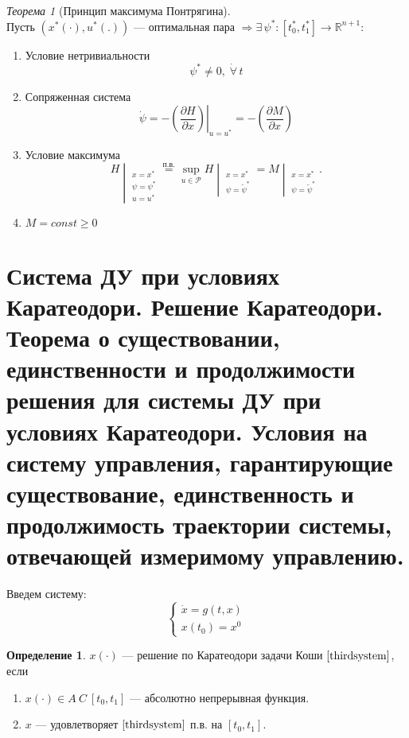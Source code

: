 \documentclass[oneside, final, 14pt, draft]{article}
\theoremstyle{definition}
\theoremstyle{definition}
\newtheorem{defin}{Определение}[section]
\theoremstyle{remark}
\theoremstyle{theorem}
\newtheorem{thm}{Теорема}[section]
\renewcommand{\geq}{\geqslant}
\begin{document}
\begin{thm}[Принцип максимума Понтрягина] \ \\
    Пусть $\left( x^*(\cdot), u^*(.)\right)$ --- оптимальная пара $\Rightarrow \exists\, \psi^*: \left[t_0^*, t_1^*\right] \rightarrow \mathbb{R}^{n+1}$:
    \begin{enumerate}
    \item Условие нетривиальности
    $$\psi^* \neq 0,\;\dot\forall\,t$$
    \item Сопряженная система
    \begin{equation*}
    \dot{\psi} = -\left.\left(\frac{\partial H}{\partial x}\right)\right|_{u=u^*} = -\left(\frac{\partial M}{\partial x}\right)
    \end{equation*}
    \item Условие максимума
    \begin{equation*}
    \left. H \middle|_{\substack{x = x^* \\ \psi = \psi^* \\ u = u^*}}\right. \stackrel{\text{п.в.}}{=}
    \sup\limits_{u \in \mathcal{P}} \left.H\middle|_{\substack{x = x^* \\ \psi = \widetilde{\psi}^*}}\right. =
    \left. M \middle|_{\substack{x = x^* \\ \psi = \widetilde{\psi}^*}}\right. .
    \end{equation*}
    \item $M = const \geq 0$
    \end{enumerate}
\end{thm}

\section{Система ДУ при условиях Каратеодори. Решение Каратеодори. Теорема о существовании, единственности и продолжимости решения для системы ДУ при условиях Каратеодори. Условия на систему управления, гарантирующие существование, единственность и продолжимость траектории системы, отвечающей измеримому управлению.}
Введем систему:
\begin{equation}\label{thirdsystem}
\begin{cases}
\dot{x} = g(t, x)\\
x(t_0) = x^0
\end{cases}
\end{equation}

\begin{defin}
$x(\cdot)$ --- решение по Каратеодори задачи Коши $\eqref{thirdsystem}$, если
    \begin{enumerate}
    \item $x(\cdot) \in A\ C\ [t_0, t_1]$ --- абсолютно непрерывная функция.
    \item $x$ --- удовлетворяет $\eqref{thirdsystem}$ п.в. на $[t_0, t_1]$.
    \end{enumerate}
\end{defin}
\end{document}

